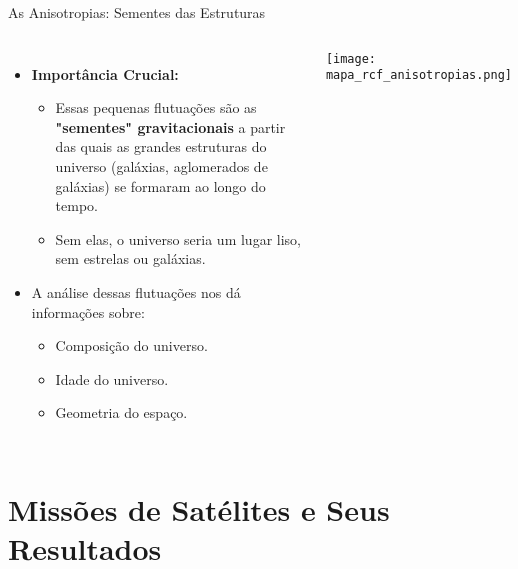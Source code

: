 \documentclass{beamer}
\begin{document}
\begin{frame}{As Anisotropias: Sementes das Estruturas}
    \begin{columns}
        \begin{itemize}
            \item \textbf{Importância Crucial:}
            \begin{itemize}
                \item Essas pequenas flutuações são as \textbf{"sementes" gravitacionais} a partir das quais as grandes estruturas do universo (galáxias, aglomerados de galáxias) se formaram ao longo do tempo.
                \item Sem elas, o universo seria um lugar liso, sem estrelas ou galáxias.
            \end{itemize}
            \item A análise dessas flutuações nos dá informações sobre:
            \begin{itemize}
                \item Composição do universo.
                \item Idade do universo.
                \item Geometria do espaço.
            \end{itemize}
        \end{itemize}
        \begin{center}
            \texttt{[image: mapa\_rcf\_anisotropias.png]} %

            \tiny
        \end{center}
    \end{columns}
\end{frame}


\section{Missões de Satélites e Seus Resultados}
\end{document}

